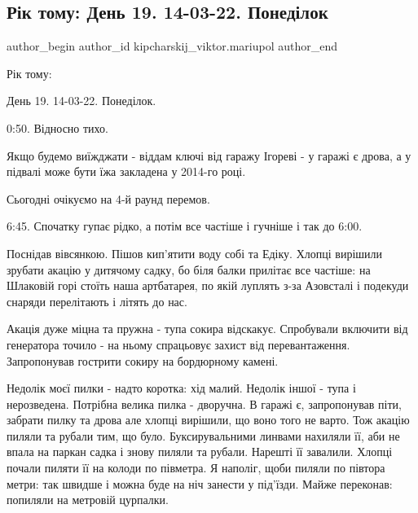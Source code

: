  
 
 
 
 

\subsection{Рік тому: День 19. 14-03-22. Понеділок}
\label{sec:14_03_2023.fb.kipcharskij_viktor.mariupol.1.r_k_tomu__den_19__14}

\ifcmt
 author_begin
   author_id kipcharskij_viktor.mariupol
 author_end
\fi

Рік тому:

День 19. 14-03-22. Понеділок.

0:50. Відносно тихо.

Якщо будемо виїжджати - віддам ключі від гаражу Ігореві - у гаражі є дрова, а у
підвалі може бути їжа закладена у 2014-го році.


Сьогодні очікуємо на 4-й раунд перемов.

6:45. Спочатку гупає рідко, а потім все частіше і гучніше і так до 6:00.

Поснідав вівсянкою. Пішов кип'ятити воду собі та Едіку. Хлопці вирішили зрубати
акацію у дитячому садку, бо біля балки прилітає все частіше: на Шлаковій горі
стоїть наша артбатарея, по якій луплять з-за Азовсталі і подекуди снаряди
перелітають і літять до нас. 

Акація дуже міцна та пружна - тупа сокира відскакує. Спробували включити від
генератора точило - на ньому спрацьовує захист від перевантаження. Запропонував
гострити сокиру на бордюрному камені.

Недолік моєї пилки - надто коротка: хід малий. Недолік іншої - тупа і
нерозведена. Потрібна велика пилка - дворучна. В гаражі є, запропонував піти,
забрати пилку та дрова але хлопці вирішили, що воно того не варто. Тож акацію
пиляли та рубали тим, що було. Буксирувальними линвами нахиляли її, аби не
впала на паркан садка і знову пиляли та рубали. Нарешті її завалили. Хлопці
почали пиляти її на колоди по півметра. Я наполіг, щоби пиляли по півтора
метри: так швидше і можна буде на ніч занести у під'їзди. Майже переконав:
попиляли на метровій цурпалки.

